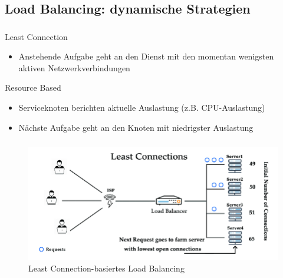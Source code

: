 \subsection{Load Balancing: dynamische Strategien}
\begin{frame}
    \frametitle{\insertsection}
    \framesubtitle{\insertsubsection}
    \begin{block}{Least Connection}
        \begin{itemize}
            \item Anstehende Aufgabe geht an den Dienst mit den momentan wenigsten aktiven Netzwerkverbindungen
        \end{itemize}
    \end{block}
    \begin{block}{Resource Based}
        \begin{itemize}
            \item Serviceknoten berichten aktuelle Auslastung (z.B. CPU-Auslastung)
            \item Nächste Aufgabe geht an den Knoten mit niedrigster Auslastung
        \end{itemize}
    \end{block}
\end{frame}

\begin{frame}
    \frametitle{\insertsection}
    \framesubtitle{\insertsubsection}

	\vspace{-12pt} %
    \begin{figure}[h]
        \centering
        \includegraphics[height=0.6\textheight]{../images/leastconnection}
        \caption{Least Connection-basiertes Load Balancing~\cite{efficient-load-balancing}}
    \end{figure}
\end{frame}

